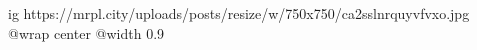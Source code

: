  
 
 
 
 

\ifcmt
  ig https://mrpl.city/uploads/posts/resize/w/750x750/ca2sslnrquyvfvxo.jpg
  @wrap center
  @width 0.9
\fi
